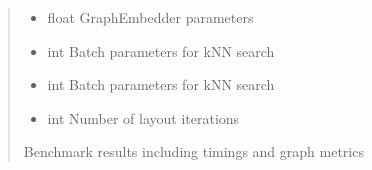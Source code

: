 \documentclass[letterpaper,10pt,english]{sphinxmanual}
\begin{document}
\begin{fulllineitems}
\begin{quote}
\begin{description}
\begin{itemize}
\item {} 
\sphinxAtStartPar
{} \textendash{} float
GraphEmbedder parameters

\item {} 
\sphinxAtStartPar
{} \textendash{} int
Batch parameters for kNN search

\item {} 
\sphinxAtStartPar
{} \textendash{} int
Batch parameters for kNN search

\item {} 
\sphinxAtStartPar
{} \textendash{} int
Number of layout iterations

\end{itemize}

\sphinxAtStartPar
Benchmark results including timings and graph metrics

\sphinxAtStartPar
{}

\end{description}\end{quote}

\end{fulllineitems}

\end{document}
